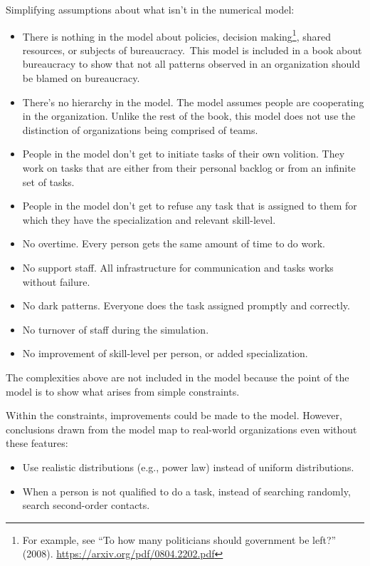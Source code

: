 Simplifying assumptions about what isn't in the numerical model:
\begin{itemize}
    \item There is nothing in the model about policies, decision making\footnote{For example, see ``To how many politicians should government be left?'' (2008). \href{https://arxiv.org/pdf/0804.2202.pdf}{https://arxiv.org/pdf/0804.2202.pdf}}, shared resources, or subjects of bureaucracy. This model is included in a book about bureaucracy to show that not all patterns observed in an organization should be blamed on bureaucracy. 
    \item There's no hierarchy in the model. The model assumes people are cooperating in the organization. Unlike the rest of the book, this model does not use the distinction of organizations being comprised of teams.
    \item People in the model don't get to initiate tasks of their own volition. They work on tasks that are either from their personal backlog or from an infinite set of tasks.
    \item People in the model don't get to refuse any task that is assigned to them for which they have the specialization and relevant skill-level.
    \item No overtime. Every person gets the same amount of time to do work.
    \item No support staff. All infrastructure for communication and tasks works without failure.
    \item No dark patterns. Everyone does the task assigned promptly and correctly.
    \item No turnover of staff during the simulation.
    \item No improvement of skill-level per person, or added specialization.
\end{itemize}
The complexities above are not included in the model because the point of the model is to show what arises from simple constraints. 

Within the constraints, improvements could be made to the model.  %
However,  conclusions drawn from the model map to real-world organizations even without these features: 
\begin{itemize}
    \item Use realistic distributions (e.g., power law) instead of uniform distributions.
    \item When a person is not qualified to do a task, instead of searching randomly, search second-order contacts.
\end{itemize}

